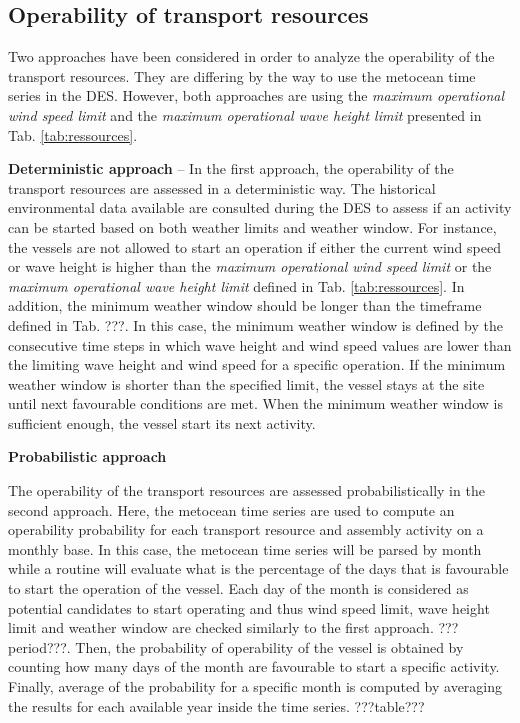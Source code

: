 \subsection{Operability of transport resources}
Two approaches have been considered in order to analyze the operability of the transport resources. They are differing by the way to use the metocean time series in the DES. However, both approaches are using the \textit{maximum operational wind speed limit} and the \textit{maximum operational wave height limit} presented in Tab. \ref{tab:ressources}.

\textbf{Deterministic approach} -- In the first approach, the operability of the transport resources are assessed in a deterministic way. The historical environmental data available are consulted during the DES to assess if an activity can be started based on both weather limits and weather window. For instance, the vessels are not allowed to start an operation if either the current wind speed or wave height is higher than the \textit{maximum operational wind speed limit} or the \textit{maximum operational wave height limit} defined in Tab. \ref{tab:ressources}. In addition, the minimum weather window should be longer than the timeframe defined in Tab. ???. In this case, the minimum weather window is defined by the consecutive time steps in which wave height and wind speed values are lower than the limiting wave height and wind speed for a specific operation. If the minimum weather window is shorter than the specified limit, the vessel stays at the site until next favourable conditions are met. When the minimum weather window is sufficient enough, the vessel start its next activity. 

\textbf{Probabilistic approach}

The operability of the transport resources are assessed probabilistically in the second approach. Here, the metocean time series are used to compute an operability probability for each transport resource and assembly activity on a monthly base. In this case, the metocean time series will be parsed by month while a routine will evaluate what is the percentage of the days that is favourable to start the operation of the vessel. Each day of the month is considered as potential candidates to start operating and thus wind speed limit, wave height limit and weather window are checked similarly to the first approach. ???period???. Then, the probability of operability of the vessel is obtained by counting how many days of the month are favourable to start a specific activity. Finally, average of the probability for a specific month is computed by averaging the results for each available year inside the time series. ???table???

